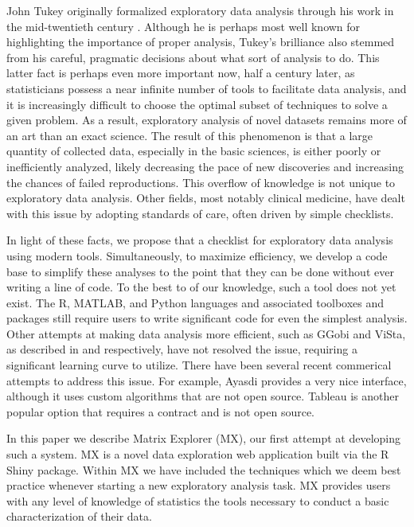 \documentclass[twoside,leqno,twocolumn]{article}
\begin{document}
John Tukey originally formalized exploratory data analysis through his work in the mid-twentieth century \cite{tukey1962future}. Although he is perhaps most well known for highlighting the importance of proper analysis, Tukey's brilliance also stemmed from his careful, pragmatic decisions about what sort of analysis to do. This latter fact is perhaps even more important now, half a century later, as statisticians possess a near infinite number of tools to facilitate data analysis, and it is increasingly difficult to choose the optimal subset of techniques to solve a given problem. As a result, 
exploratory analysis of novel datasets remains more of an art than an exact science. The result of this phenomenon is that a large quantity of collected data, especially in the basic sciences, is either poorly or inefficiently analyzed, likely decreasing the pace of new discoveries and increasing the chances of failed reproductions. This overflow of knowledge is not unique to exploratory data analysis. Other fields, most notably clinical medicine, have dealt with this issue by adopting standards of care, often driven by simple checklists. 

In light of these facts, we propose that a checklist for exploratory data analysis using modern tools. Simultaneously, to maximize efficiency, we develop a code base to simplify these analyses to the point that they can be done without ever writing a line of code. To the best to of our knowledge, such a tool does not yet exist. The R, MATLAB, and Python languages and associated toolboxes and packages still require users to write significant code for even the simplest analysis. Other attempts at making data analysis more efficient, such as GGobi and ViSta, as described in \cite{swayne2003ggobi} and \cite{valero2011using} respectively, have not resolved the issue, requiring a significant learning curve to utilize. There have been several recent commerical attempts to address this issue. For example, Ayasdi provides a very nice interface, although it uses custom algorithms that are not open source. Tableau is another popular option that requires a contract and is not open source. 

In this paper we describe Matrix Explorer (MX), our first attempt at developing such a system. MX is a novel data exploration web application built via the R Shiny package. Within MX we have included the techniques which we deem best practice whenever starting a new exploratory analysis task. MX provides users with any level of knowledge of statistics the tools necessary to conduct a basic characterization of their data.
\end{document}
